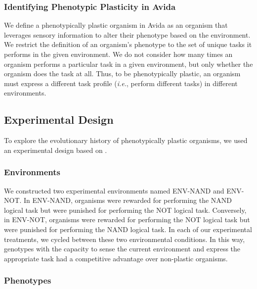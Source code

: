 \subsubsection{Identifying Phenotypic Plasticity in Avida}
\label{chapter:origins-of-plasticity:sec:methods:avida:identifying-plasticity}

We define a phenotypically plastic organism in Avida as an organism that leverages sensory information to alter their phenotype based on the environment.
We restrict the definition of an organism's phenotype to the set of unique tasks it performs in the given environment. 
We do not consider how many times an organism performs a particular task in a given environment, but only whether the organism does the task at all. 
Thus, to be phenotypically plastic, an organism must express a different task profile (\textit{i.e.}, perform different tasks) in different environments. 

\subsection{Experimental Design}
\label{chapter:origins-of-plasticity:sec:methods:experimental-design}

To explore the evolutionary history of phenotypically plastic organisms, we used an experimental design based on \citep{clune_investigating_2007}. 

\subsubsection{Environments}
\label{chapter:origins-of-plasticity:sec:methods:experimental-design:environments}

We constructed two experimental environments named ENV-NAND and ENV-NOT.
In ENV-NAND, organisms were rewarded for performing the NAND logical task but were punished for performing the NOT logical task. 
Conversely, in ENV-NOT, organisms were rewarded for performing the NOT logical task but were punished for performing the NAND logical task. 
In each of our experimental treatments, we cycled between these two environmental conditions. 
In this way, genotypes with the capacity to sense the current environment and express the appropriate task had a competitive advantage over non-plastic organisms. 

\subsubsection{Phenotypes}
\label{chapter:origins-of-plasticity:sec:methods:experimental-design:phenotypes}

